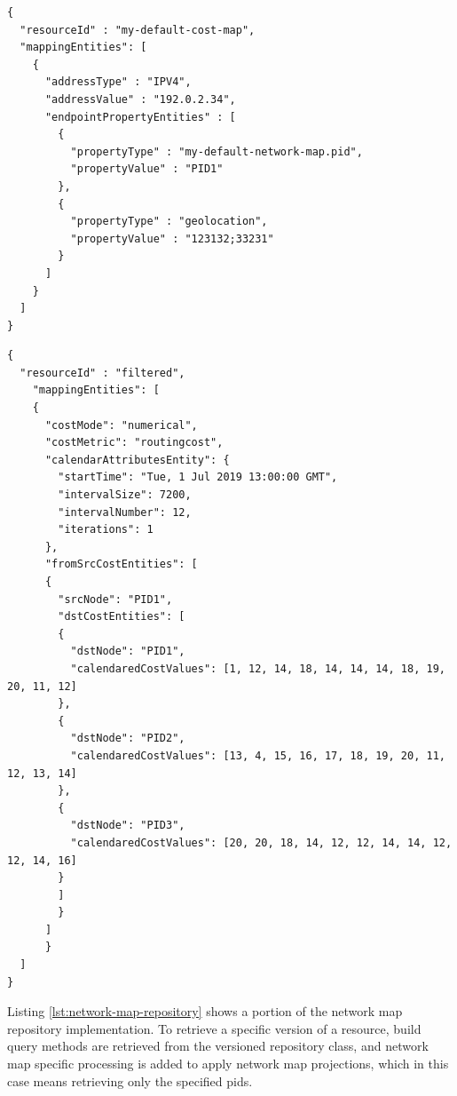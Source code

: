 \begin{center}
\begin{minipage}[t]{.43\textwidth}
\begin{lstlisting}[frame=lrbt, basicstyle=\tiny]
{
  "resourceId" : "my-default-cost-map",
  "mappingEntities": [
    {
      "addressType" : "IPV4",
      "addressValue" : "192.0.2.34",
      "endpointPropertyEntities" : [
        {
          "propertyType" : "my-default-network-map.pid",
          "propertyValue" : "PID1"
        },
        {
          "propertyType" : "geolocation",
          "propertyValue" : "123132;33231"
        }
      ]
    }
  ]
}
\end{lstlisting}
\end{minipage}\hfill
\begin{minipage}[t]{.54\textwidth}
\begin{lstlisting}[frame=lrbt, basicstyle=\tiny]
{
  "resourceId" : "filtered",
    "mappingEntities": [
    {
      "costMode": "numerical",
      "costMetric": "routingcost",
      "calendarAttributesEntity": {
        "startTime": "Tue, 1 Jul 2019 13:00:00 GMT",
        "intervalSize": 7200,
        "intervalNumber": 12,
        "iterations": 1
      },
      "fromSrcCostEntities": [
      {
        "srcNode": "PID1",
        "dstCostEntities": [
        {
          "dstNode": "PID1",
          "calendaredCostValues": [1, 12, 14, 18, 14, 14, 14, 18, 19, 20, 11, 12]
        },
        {
          "dstNode": "PID2",
          "calendaredCostValues": [13, 4, 15, 16, 17, 18, 19, 20, 11, 12, 13, 14]
        },
        {
          "dstNode": "PID3",
          "calendaredCostValues": [20, 20, 18, 14, 12, 12, 14, 14, 12, 12, 14, 16]
        }
        ]
        }
      ]
      }
  ]
}
\end{lstlisting}
\end{minipage}
\label{lst:costmap-vs-endpoint-prop}
\end{center}

    Listing \ref{lst:network-map-repository} shows a portion of the network map repository implementation.
    To retrieve a specific version of a resource, build query methods are retrieved from the versioned repository class, and network map specific processing is added to apply network map projections, which in this case means retrieving only the specified \glspl{pid}.


